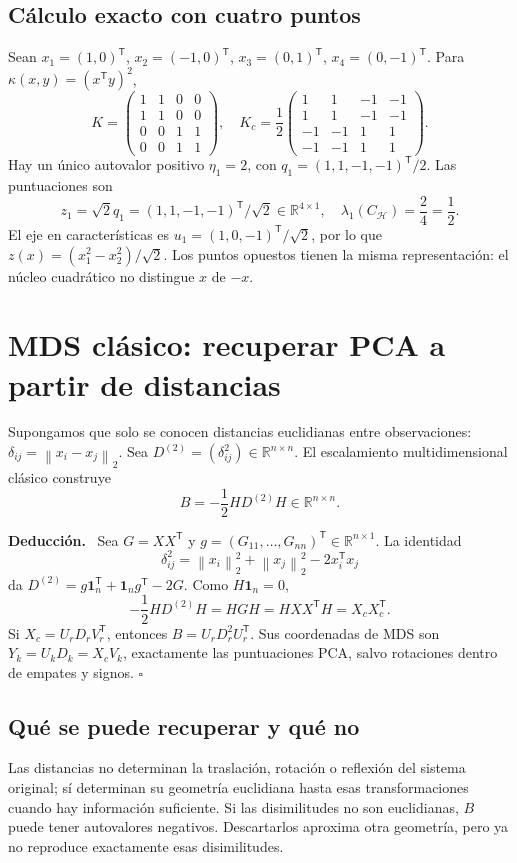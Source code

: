 \documentclass[11pt,a4paper]{article}
\newcommand{\R}{\mathbb R}
\newcommand{\T}{^{\mathsf T}}
\newcommand{\norm}[1]{\left\lVert #1\right\rVert}
\newenvironment{deduccion}{\par\textbf{Deducción.}\ }{\hfill$\square$\par}
\newcommand{\ones}{\mathbf 1}
\theoremstyle{definition}
\begin{document}
\subsection{Cálculo exacto con cuatro puntos}
Sean $x_1=(1,0)\T$, $x_2=(-1,0)\T$, $x_3=(0,1)\T$, $x_4=(0,-1)\T$. Para $\kappa(x,y)=(x\T y)^2$,
\[
K=\begin{pmatrix}1&1&0&0\\1&1&0&0\\0&0&1&1\\0&0&1&1\end{pmatrix},\quad
K_c=\frac12\begin{pmatrix}1&1&-1&-1\\1&1&-1&-1\\-1&-1&1&1\\-1&-1&1&1\end{pmatrix}.
\]
Hay un único autovalor positivo $\eta_1=2$, con $q_1=(1,1,-1,-1)\T/2$. Las puntuaciones son
\[
z_1=\sqrt2q_1=(1,1,-1,-1)\T/\sqrt2\in\R^{4\times1},\quad
\lambda_1(C_{\mathcal H})=\frac24=\frac12.
\]
El eje en características es $u_1=(1,0,-1)\T/\sqrt2$, por lo que $z(x)=(x_1^2-x_2^2)/\sqrt2$. Los puntos opuestos tienen la misma representación: el núcleo cuadrático no distingue $x$ de $-x$.

\section{MDS clásico: recuperar PCA a partir de distancias}
Supongamos que solo se conocen distancias euclidianas entre observaciones: $\delta_{ij}=\norm{x_i-x_j}_2$. Sea $D^{(2)}=(\delta_{ij}^2)\in\R^{n\times n}$. El escalamiento multidimensional clásico construye
\[
\boxed{B=-\frac12HD^{(2)}H\in\R^{n\times n}}.
\]
\begin{deduccion}
Sea $G=XX\T$ y $g=(G_{11},\ldots,G_{nn})\T\in\R^{n\times1}$. La identidad
\[
\delta_{ij}^2=\norm{x_i}_2^2+\norm{x_j}_2^2-2x_i\T x_j
\]
da $D^{(2)}=g\ones_n\T+\ones_ng\T-2G$. Como $H\ones_n=0$,
\[
-\frac12HD^{(2)}H=HGH=HXX\T H=X_cX_c\T.
\]
Si $X_c=U_rD_rV_r\T$, entonces $B=U_rD_r^2U_r\T$. Sus coordenadas de MDS son $Y_k=U_kD_k=X_cV_k$, exactamente las puntuaciones PCA, salvo rotaciones dentro de empates y signos.
\end{deduccion}
\subsection{Qué se puede recuperar y qué no}
Las distancias no determinan la traslación, rotación o reflexión del sistema original; sí determinan su geometría euclidiana hasta esas transformaciones cuando hay información suficiente. Si las disimilitudes no son euclidianas, $B$ puede tener autovalores negativos. Descartarlos aproxima otra geometría, pero ya no reproduce exactamente esas disimilitudes.
\end{document}
